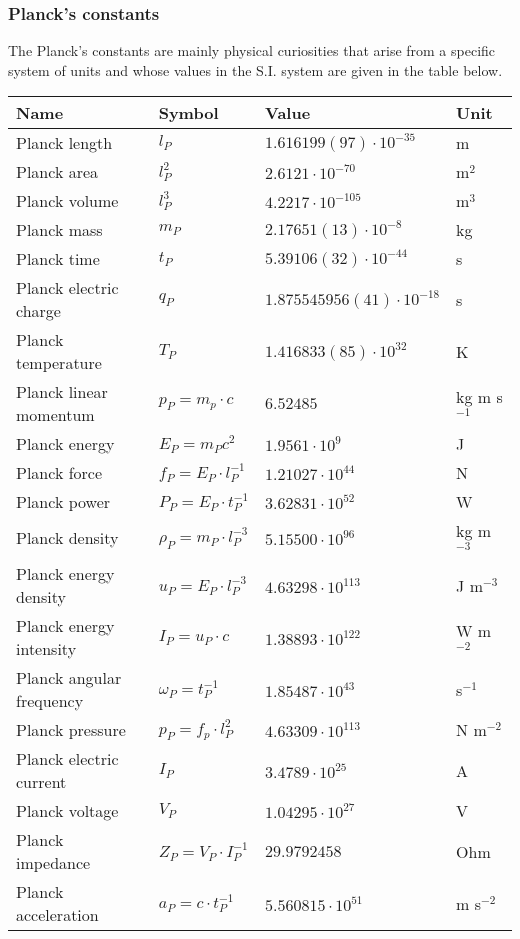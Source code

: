 	\pagebreak
	\subsubsection{Planck's constants}
	The Planck's constants are mainly physical curiosities that arise from a specific system of units and whose values in the S.I. system are given in the table below.
	\begin{center}
	\begin{tabular}{||l|lll||}
	\hline
	{\textbf{Name}}&{\textbf{Symbol}}&{\textbf{Value}}&{\textbf{Unit}}\\
	\hline
	\hline
	Planck length &$l_P$&$1.616199(97)\cdot 10^{-35}$&m\rule{0pt}{13pt}\\
	Planck area		&$l_P^2$&$2.6121 \cdot 10^{-70}$&m$^2$\rule{0pt}{13pt}\\	
	Planck volume 		&$l_P^3$&$4.2217 \cdot 10^{-105}$&m$^3$\rule{0pt}{13pt}\\
	Planck mass	 	&$m_P$&$2.17651(13)\cdot 10^{-8}$&kg\rule{0pt}{13pt}\\
	Planck time	 	&$t_P$&$5.39106(32)\cdot 10^{-44}$&s\rule{0pt}{13pt}\\
	Planck electric charge &$q_P$&$1.875545956(41)\cdot 10^{-18}$&s\rule{0pt}{13pt}\\
	Planck temperature 	&$T_P$&$1.416833(85)\cdot 10^{32}$&K\rule{0pt}{13pt}\\
	Planck linear momentum 		&$p_P=m_p\cdot c$&$6.52485$&kg m s$^{-1}$\rule{0pt}{13pt}\\
	Planck energy 		&$E_P=m_Pc^2$&$1.9561\cdot 10^9 $&J\rule{0pt}{13pt}\\
	Planck force 		&$f_P=E_P\cdot l_P^{-1}$&$1.21027\cdot 10^{44} $&N\rule{0pt}{13pt}\\
	Planck power 		&$P_P=E_P\cdot t_P^{-1}$&$3.62831\cdot 10^{52}$&W\rule{0pt}{13pt}\\
	Planck density 		&$\rho_P=m_P\cdot l_P^{-3}$&$5.15500\cdot 10^{96}$&kg m$^{-3}$\rule{0pt}{13pt}\\
	Planck energy density 		&$u_P=E_P\cdot l_P^{-3}$&$4.63298\cdot 10^{113}$&J m$^{-3}$\rule{0pt}{13pt}\\
	Planck energy intensity 		&$I_P=u_P\cdot c$&$1.38893\cdot 10^{122}$&W m$^{-2}$\rule{0pt}{13pt}\\
	Planck angular frequency 		&$\omega_P=t_P^{-1}$&$1.85487\cdot 10^{43}$&s$^{-1}$\rule{0pt}{13pt}\\
	Planck pressure 		&$p_P=f_p\cdot l_P^2$&$4.63309\cdot 10^{113}$&N m$^{-2}$\rule{0pt}{13pt}\\
	Planck electric current 		&$I_P$&$3.4789\cdot 10^{25}$&A\rule{0pt}{13pt}\\
	Planck voltage		&$V_P$&$1.04295\cdot 10^{27}$&V\rule{0pt}{13pt}\\
	Planck impedance		&$Z_P=V_P\cdot I_P^{-1}$&$29.9792458$& Ohm\rule{0pt}{13pt}\\
	Planck acceleration		&$a_P=c\cdot t_P^{-1}$&$5.560815\cdot 10^{51}$&m s$^{-2}$\rule{0pt}{13pt}\\
	\hline
	\end{tabular}
	\end{center}
